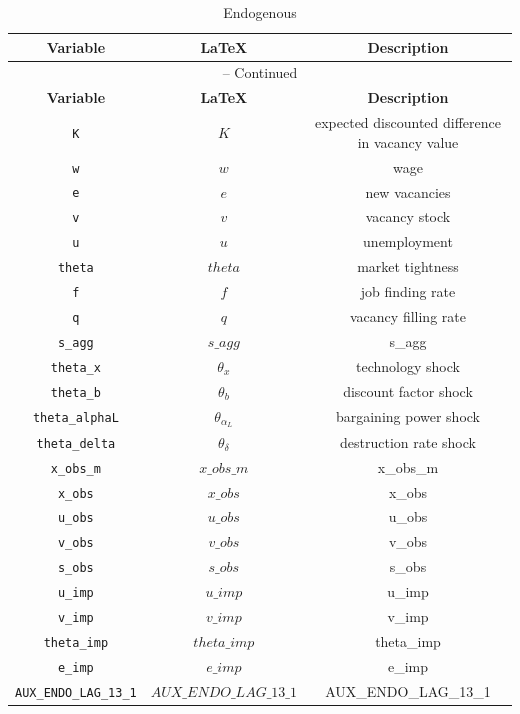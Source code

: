 \begin{center}
\begin{longtable}{ccc}
\caption{Endogenous}\\%
\hline%
\multicolumn{1}{c}{\textbf{Variable}} &
\multicolumn{1}{c}{\textbf{\LaTeX}} &
\multicolumn{1}{c}{\textbf{Description}}\\%
\hline\hline%
\endfirsthead
\multicolumn{3}{c}{{\tablename} \thetable{} -- Continued}\\%
\hline%
\multicolumn{1}{c}{\textbf{Variable}} &
\multicolumn{1}{c}{\textbf{\LaTeX}} &
\multicolumn{1}{c}{\textbf{Description}}\\%
\hline\hline%
\endhead
\texttt{K} & ${K}$ & expected discounted difference in vacancy value\\
\texttt{w} & ${w}$ & wage\\
\texttt{e} & ${e}$ & new vacancies\\
\texttt{v} & ${v}$ & vacancy stock\\
\texttt{u} & ${u}$ & unemployment\\
\texttt{theta} & ${theta}$ & market tightness\\
\texttt{f} & ${f}$ & job finding rate\\
\texttt{q} & ${q}$ & vacancy filling rate\\
\texttt{s\_agg} & $s\_agg$ & s\_agg\\
\texttt{theta\_x} & ${\theta_x}$ & technology shock\\
\texttt{theta\_b} & ${\theta_b}$ & discount factor shock\\
\texttt{theta\_alphaL} & ${\theta_{\alpha_L}}$ & bargaining power shock\\
\texttt{theta\_delta} & ${\theta_{\delta}}$ & destruction rate shock\\
\texttt{x\_obs\_m} & $x\_obs\_m$ & x\_obs\_m\\
\texttt{x\_obs} & $x\_obs$ & x\_obs\\
\texttt{u\_obs} & $u\_obs$ & u\_obs\\
\texttt{v\_obs} & $v\_obs$ & v\_obs\\
\texttt{s\_obs} & $s\_obs$ & s\_obs\\
\texttt{u\_imp} & $u\_imp$ & u\_imp\\
\texttt{v\_imp} & $v\_imp$ & v\_imp\\
\texttt{theta\_imp} & $theta\_imp$ & theta\_imp\\
\texttt{e\_imp} & $e\_imp$ & e\_imp\\
\texttt{AUX\_ENDO\_LAG\_13\_1} & $AUX\_ENDO\_LAG\_13\_1$ & AUX\_ENDO\_LAG\_13\_1\\
\hline%
\end{longtable}
\end{center}

